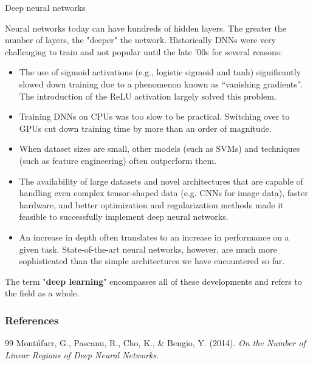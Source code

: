 \begin{vbframe}{Deep neural networks}

Neural networks today can have %
hundreds of hidden layers. The greater the number of layers, the "deeper" the network. Historically %
DNNs were very challenging to train and not popular until the late '00s for several reasons:
\lz
\begin{itemize}
\item %
The use of sigmoid activations (e.g., logistic sigmoid and tanh) significantly slowed down training due to a phenomenon known as \enquote{vanishing gradients}. The introduction of the ReLU activation largely solved this problem.
\item Training DNNs on CPUs was too slow to be practical. Switching over to GPUs cut down training time by more than an order of magnitude.
\item When dataset sizes are small, other models (such as SVMs) and techniques (such as feature engineering) often outperform them. 
\end{itemize}
\framebreak
\begin{itemize}
\item The availability of large datasets and novel architectures that are capable of handling even complex tensor-shaped data (e.g. CNNs for image data), faster hardware, and better optimization and regularization methods made it feasible to successfully implement deep neural networks.%
\lz

\item An increase in depth often translates to an increase in performance on a given task. State-of-the-art neural networks, however, are much more sophisticated than the simple architectures we have encountered so far.

\lz
\end{itemize}
The term "\textbf{deep learning}" encompasses all of these developments and refers to the field as a whole.
\end{vbframe}
\begin{vbframe}
\frametitle{References}
\footnotesize{
\begin{thebibliography}{99}
 Mont\'{u}farr, G., Pascanu, R., Cho, K., \& Bengio, Y. (2014). \textit{On the Number of Linear Regions of Deep Neural Networks}. 
\end{thebibliography}
}
\end{vbframe}

